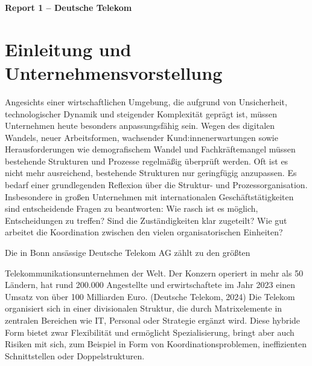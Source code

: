 \documentclass[12pt,a4paper]{article}
\newcommand{\zitat}[1]{\parencite{#1}}
\begin{document}
	
	\setcounter{page}{1}
	\begin{center}
		\textbf{Report 1 – Deutsche Telekom}
	\end{center}
	
	
	
	\section{Einleitung und Unternehmensvorstellung}
	
	Angesichts einer wirtschaftlichen Umgebung, die aufgrund von
	Unsicherheit, technologischer Dynamik und steigender Komplexität geprägt
	ist, müssen Unternehmen heute besonders anpassungsfähig sein. Wegen des
	digitalen Wandels, neuer Arbeitsformen, wachsender Kund:innenerwartungen
	sowie Herausforderungen wie demografischem Wandel und Fachkräftemangel
	müssen bestehende Strukturen und Prozesse regelmäßig überprüft werden.
	\zitat{kornmeier2022} Oft ist es nicht mehr ausreichend, bestehende
	Strukturen nur geringfügig anzupassen. Es bedarf einer grundlegenden
	Reflexion über die Struktur- und Prozessorganisation. Insbesondere in
	großen Unternehmen mit internationalen Geschäftstätigkeiten sind
	entscheidende Fragen zu beantworten: Wie rasch ist es möglich,
	Entscheidungen zu treffen? Sind die Zuständigkeiten klar zugeteilt? Wie
	gut arbeitet die Koordination zwischen den vielen organisatorischen
	Einheiten?
	
	\noindent Die in Bonn ansässige Deutsche Telekom AG zählt zu den größten
	
	\noindent Telekommunikationsunternehmen der Welt. Der Konzern operiert in mehr als
	50 Ländern, hat rund 200.000 Angestellte und erwirtschaftete im Jahr
	2023 einen Umsatz von über 100 Milliarden Euro. (Deutsche Telekom, 2024)
	Die Telekom organisiert sich in einer divisionalen Struktur, die durch
	Matrixelemente in zentralen Bereichen wie IT, Personal oder Strategie
	ergänzt wird.\zitat{vahs2023a} Diese hybride Form bietet zwar Flexibilität
	und ermöglicht Spezialisierung, bringt aber auch Risiken mit sich, zum
	Beispiel in Form von Koordinationsproblemen, ineffizienten
	Schnittstellen oder Doppelstrukturen.
	
\end{document}
